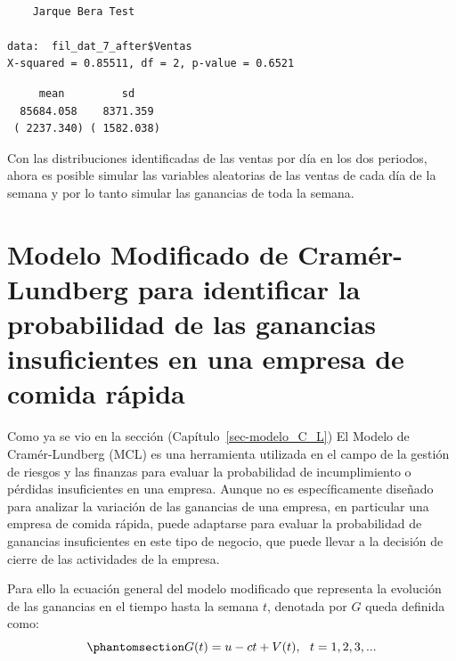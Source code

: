 \documentclass[
  us-letterpaper,
]{scrreprt}
\newenvironment{Shaded}{\begin{snugshade}}{\end{snugshade}}
\newcommand{\CommentTok}[1]{\textcolor[rgb]{0.37,0.37,0.37}{#1}}
\newcommand{\FunctionTok}[1]{\textcolor[rgb]{0.28,0.35,0.67}{#1}}
\newcommand{\NormalTok}[1]{\textcolor[rgb]{0.00,0.23,0.31}{#1}}
\newcommand{\SpecialCharTok}[1]{\textcolor[rgb]{0.37,0.37,0.37}{#1}}
\newcommand{\StringTok}[1]{\textcolor[rgb]{0.13,0.47,0.30}{#1}}
\theoremstyle{plain}
\theoremstyle{plain}
\theoremstyle{definition}
\theoremstyle{remark}
\begin{document}
\begin{verbatim}

    Jarque Bera Test

data:  fil_dat_7_after$Ventas
X-squared = 0.85511, df = 2, p-value = 0.6521
\end{verbatim}

\begin{Shaded}
\end{Shaded}

\begin{verbatim}
     mean         sd    
  85684.058    8371.359 
 ( 2237.340) ( 1582.038)
\end{verbatim}

Con las distribuciones identificadas de las ventas por día en los dos
periodos, ahora es posible simular las variables aleatorias de las
ventas de cada día de la semana y por lo tanto simular las ganancias de
toda la semana.

\section{Modelo Modificado de Cramér-Lundberg para identificar la
probabilidad de las ganancias insuficientes en una empresa de comida
rápida}\label{modelo-modificado-de-cramuxe9r-lundberg-para-identificar-la-probabilidad-de-las-ganancias-insuficientes-en-una-empresa-de-comida-ruxe1pida}

Como ya se vio en la sección (Capítulo~\ref{sec-modelo_C_L}) El Modelo
de Cramér-Lundberg (MCL) es una herramienta utilizada en el campo de la
gestión de riesgos y las finanzas para evaluar la probabilidad de
incumplimiento o pérdidas insuficientes en una empresa. Aunque no es
específicamente diseñado para analizar la variación de las ganancias de
una empresa, en particular una empresa de comida rápida, puede adaptarse
para evaluar la probabilidad de ganancias insuficientes en este tipo de
negocio, que puede llevar a la decisión de cierre de las actividades de
la empresa.

Para ello la ecuación general del modelo modificado que representa la
evolución de las ganancias en el tiempo hasta la semana \(t\), denotada
por \(G\) queda definida como:
\begin{equation}\phantomsection\label{eq-4.1pdf}{G(t) = u -ct + V(t), \ \ t = 1, 2, 3, ...}\end{equation}
\end{document}
